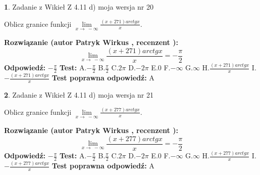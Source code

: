 \documentclass[12pt, a4paper]{article}
\theoremstyle{definition} %
\newtheorem{zad}{}
\newcommand{\zadStart}[1]{\begin{zad}#1\newline}
\newcommand{\zadStop}{\end{zad}}
\newcommand{\rozwStart}[2]{\noindent \textbf{Rozwiązanie (autor #1 , recenzent #2): }\newline}
\newcommand{\rozwStop}{\newline}
\newcommand{\odpStart}{\noindent \textbf{Odpowiedź:}\newline}
\newcommand{\odpStop}{\newline}
\newcommand{\testStart}{\noindent \textbf{Test:}\newline}
\newcommand{\testStop}{\newline}
\newcommand{\kluczStart}{\noindent \textbf{Test poprawna odpowiedź:}\newline}
\newcommand{\kluczStop}{\newline}
\begin{document}
\zadStart{Zadanie z Wikieł Z 4.11 d) moja wersja nr 20}

Oblicz granice funkcji $\lim\limits_{x\to\ -\infty}\frac{(x+271)arctgx}{x}$.
\zadStop
\rozwStart{Patryk Wirkus}{}
$$\lim\limits_{x\to\ -\infty}\frac{(x+271)arctgx}{x} = -\frac{\pi}{2}$$
\rozwStop
\odpStart
$-\frac{\pi}{2}$
\odpStop
\testStart
A.$-\frac{\pi}{2}$ B.$\frac{\pi}{2}$ C.$2\pi$ D.$-2\pi$ E.$0$ F.$-\infty$ G.$\infty$ H.$\frac{(x+271)arctgx}{x}$ I.$-\frac{(x+271)arctgx}{x}$
\testStop
\kluczStart
A
\kluczStop



\zadStart{Zadanie z Wikieł Z 4.11 d) moja wersja nr 21}

Oblicz granice funkcji $\lim\limits_{x\to\ -\infty}\frac{(x+277)arctgx}{x}$.
\zadStop
\rozwStart{Patryk Wirkus}{}
$$\lim\limits_{x\to\ -\infty}\frac{(x+277)arctgx}{x} = -\frac{\pi}{2}$$
\rozwStop
\odpStart
$-\frac{\pi}{2}$
\odpStop
\testStart
A.$-\frac{\pi}{2}$ B.$\frac{\pi}{2}$ C.$2\pi$ D.$-2\pi$ E.$0$ F.$-\infty$ G.$\infty$ H.$\frac{(x+277)arctgx}{x}$ I.$-\frac{(x+277)arctgx}{x}$
\testStop
\kluczStart
A
\kluczStop
\end{document}
